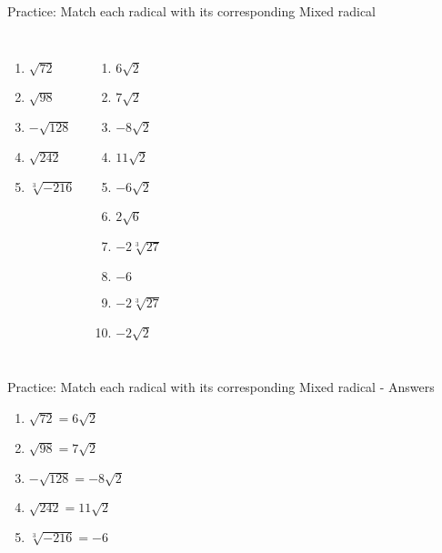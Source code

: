 \documentclass[aspectratio=169]{beamer}
\begin{document}
\begin{frame}{Practice: Match each radical with its corresponding Mixed radical}
\begin{tcolorbox}[colback=lightgray,colframe=accent,title=Match Problems]
\footnotesize
\begin{columns}[T]
\begin{enumerate}
  \item $\sqrt{72}$
  \item $\sqrt{98}$
  \item $-\sqrt{128}$
  \item $\sqrt{242}$
  \item $\sqrt[3]{-216}$
\end{enumerate}
\begin{enumerate}
  \item $6\sqrt{2}$
  \item $7\sqrt{2}$
  \item $-8\sqrt{2}$
  \item $11\sqrt{2}$
  \item $-6\sqrt{2}$
  \item $2\sqrt{6}$
  \item $-2\sqrt[3]{27}$
  \item $-6$
  \item $-2\sqrt[3]{27}$
  \item $-2\sqrt{2}$
\end{enumerate}
\end{columns}
\end{tcolorbox}
\end{frame}

\begin{frame}{Practice: Match each radical with its corresponding Mixed radical - Answers}
\begin{tcolorbox}[colback=lightgray,colframe=primary,title=Solutions]
\footnotesize
\begin{enumerate}
  \item $\sqrt{72} = 6\sqrt{2}$
  \item $\sqrt{98} = 7\sqrt{2}$
  \item $-\sqrt{128} = -8\sqrt{2}$
  \item $\sqrt{242} = 11\sqrt{2}$
  \item $\sqrt[3]{-216} = -6$
\end{enumerate}
\end{tcolorbox}
\end{frame}
\end{document}
